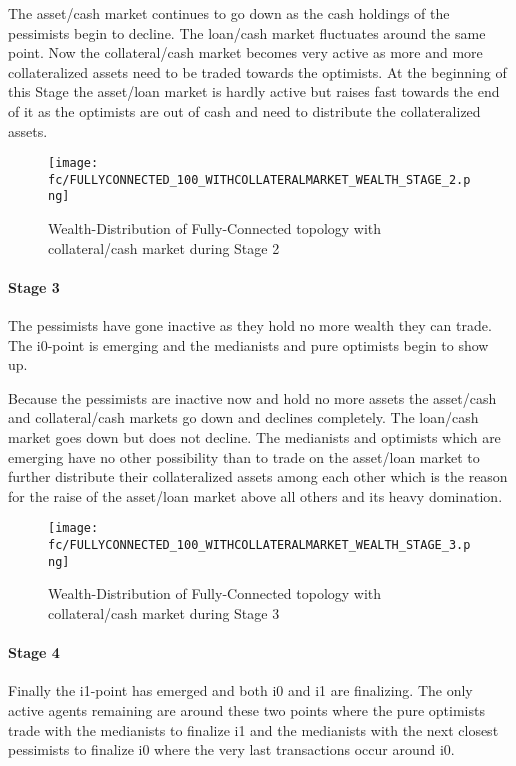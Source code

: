 \documentclass[Bachelorarbeit.tex]{subfiles}
\begin{document}
\medskip

The asset/cash market continues to go down as the cash holdings of the pessimists begin to decline.
The loan/cash market fluctuates around the same point.
Now the collateral/cash market becomes very active as more and more collateralized assets need to be traded towards the optimists.
At the beginning of this Stage the asset/loan market is hardly active but raises fast towards the end of it as the optimists are out of cash and need to distribute the collateralized assets.

\begin{figure}[H]
	\centering
  \texttt{[image: fc/FULLYCONNECTED\_100\_WITHCOLLATERALMARKET\_WEALTH\_STAGE\_2.png]}
  	\caption{Wealth-Distribution of Fully-Connected topology with collateral/cash market during Stage 2}
	\label{fig:markets_FULLYCONNECTED_100_WITHCOLLATERALMARKET_WEALTH_STAGE_2}
\end{figure}

\paragraph{Stage 3}
The pessimists have gone inactive as they hold no more wealth they can trade. The i0-point is emerging and the medianists and pure optimists begin to show up.

\medskip

Because the pessimists are inactive now and hold no more assets the asset/cash and collateral/cash markets go down and declines completely.
The loan/cash market goes down but does not decline.
The medianists and optimists which are emerging have no other possibility than to trade on the asset/loan market to further distribute their collateralized assets among each other which is the reason for the raise of the asset/loan market above all others and its heavy domination.

\begin{figure}[H]
	\centering
  \texttt{[image: fc/FULLYCONNECTED\_100\_WITHCOLLATERALMARKET\_WEALTH\_STAGE\_3.png]}
  	\caption{Wealth-Distribution of Fully-Connected topology with collateral/cash market during Stage 3}
	\label{fig:markets_FULLYCONNECTED_100_WITHCOLLATERALMARKET_WEALTH_STAGE_3}
\end{figure}

\paragraph{Stage 4}
Finally the i1-point has emerged and both i0 and i1 are finalizing. The only active agents remaining are around these two points where the pure optimists trade with the medianists to finalize i1 and the medianists with the next closest pessimists to finalize i0 where the very last transactions occur around i0.
\end{document}
